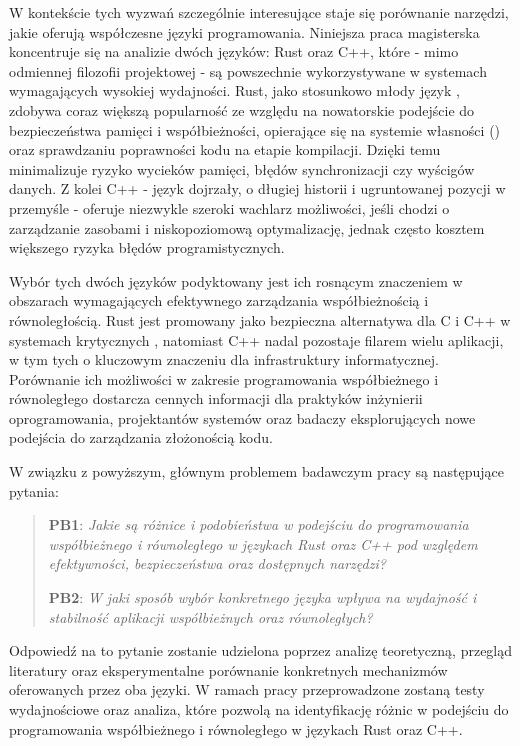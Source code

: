 W kontekście tych wyzwań szczególnie interesujące staje się porównanie narzędzi, jakie oferują współczesne języki programowania. Niniejsza praca magisterska koncentruje się na analizie dwóch języków: Rust oraz C++, które - mimo odmiennej filozofii projektowej - są powszechnie wykorzystywane w systemach wymagających wysokiej wydajności. Rust, jako stosunkowo młody język \cite{}, zdobywa coraz większą popularność\cite{} ze względu na nowatorskie podejście do bezpieczeństwa pamięci i współbieżności, opierające się na systemie własności () oraz sprawdzaniu poprawności kodu na etapie kompilacji. Dzięki temu minimalizuje ryzyko wycieków pamięci, błędów synchronizacji czy wyścigów danych. Z kolei C++ - język dojrzały, o długiej historii i ugruntowanej pozycji w przemyśle - oferuje niezwykle szeroki wachlarz możliwości, jeśli chodzi o zarządzanie zasobami i niskopoziomową optymalizację, jednak często kosztem większego ryzyka błędów programistycznych.

Wybór tych dwóch języków podyktowany jest ich rosnącym znaczeniem w obszarach wymagających efektywnego zarządzania współbieżnością i równoległością. Rust jest promowany jako bezpieczna alternatywa dla C i C++ w systemach krytycznych \cite{}, natomiast C++ nadal pozostaje filarem wielu aplikacji, w tym tych o kluczowym znaczeniu dla infrastruktury informatycznej. Porównanie ich możliwości w zakresie programowania współbieżnego i równoległego dostarcza cennych informacji dla praktyków inżynierii oprogramowania, projektantów systemów oraz badaczy eksplorujących nowe podejścia do zarządzania złożonością kodu.

W związku z powyższym, głównym problemem badawczym pracy są następujące pytania:
\begin{quote}
    \item \textbf{PB1}: 
    \emph{Jakie są różnice i podobieństwa w podejściu do programowania współbieżnego i równoległego w językach Rust oraz C++ pod względem efektywności, bezpieczeństwa oraz dostępnych narzędzi?}
    \item \textbf{PB2}:
    \emph{W jaki sposób wybór konkretnego języka wpływa na wydajność i stabilność aplikacji współbieżnych oraz równoległych?}
\end{quote}
Odpowiedź na to pytanie zostanie udzielona poprzez analizę teoretyczną, przegląd literatury oraz eksperymentalne porównanie konkretnych mechanizmów oferowanych przez oba języki. W ramach pracy przeprowadzone zostaną testy wydajnościowe oraz analiza, które pozwolą na identyfikację różnic w podejściu do programowania współbieżnego i równoległego w językach Rust oraz C++.

